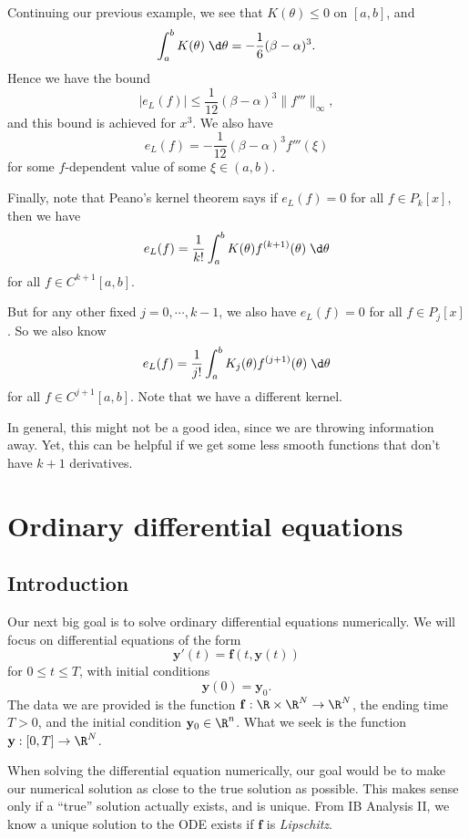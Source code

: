 \documentclass[a4paper]{article}
\begin{document}
\begin{eg}
  Continuing our previous example, we see that $K(\theta) \leq 0$ on $[a, b]$, and
  \[
    \int_a^b K(\theta)\;\d \theta = -\frac{1}{6}(\beta - \alpha)^3.
  \]
  Hence we have the bound
  \[
    |e_L(f)| \leq \frac{1}{12}(\beta - \alpha)^3 \|f'''\|_{\infty},
  \]
  and this bound is achieved for $x^3$. We also have
  \[
    e_L(f) = -\frac{1}{12}(\beta - \alpha)^3 f'''(\xi)
  \]
  for some $f$-dependent value of some $\xi \in (a, b)$.
\end{eg}

Finally, note that Peano's kernel theorem says if $e_L(f) = 0$ for all $f \in P_k[x]$, then we have
\[
  e_L(f) = \frac{1}{k!} \int_a^b K(\theta) f^{(k + 1)}(\theta)\;\d \theta
\]
for all $f \in C^{k + 1}[a, b]$.

But for any other fixed $j = 0, \cdots, k - 1$, we also have $e_L(f) = 0$ for all $f \in P_j[x]$. So we also know
\[
  e_L(f) = \frac{1}{j!} \int_a^b K_j (\theta) f^{(j + 1)}(\theta)\;\d \theta
\]
for all $f \in C^{j + 1}[a, b]$. Note that we have a different kernel.

In general, this might not be a good idea, since we are throwing information away. Yet, this can be helpful if we get some less smooth functions that don't have $k + 1$ derivatives.

\section{Ordinary differential equations}
\subsection{Introduction}
Our next big goal is to solve ordinary differential equations numerically. We will focus on differential equations of the form
\[
  \mathbf{y}'(t) = \mathbf{f}(t, \mathbf{y}(t))
\]
for $0 \leq t \leq T$, with initial conditions
\[
  \mathbf{y}(0) = \mathbf{y}_0.
\]
The data we are provided is the function $\mathbf{f}: \R \times \R^N \to \R^N$, the ending time $T > 0$, and the initial condition $\mathbf{y}_0 \in \R^n$. What we seek is the function $\mathbf{y}: [0, T] \to \R^N$.

When solving the differential equation numerically, our goal would be to make our numerical solution as close to the true solution as possible. This makes sense only if a ``true'' solution actually exists, and is unique. From IB Analysis II, we know a unique solution to the ODE exists if $\mathbf{f}$ is \emph{Lipschitz}.
\end{document}
